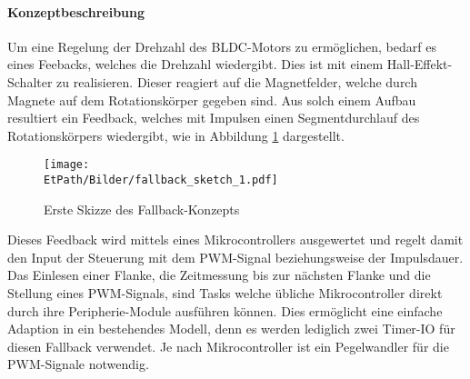 \paragraph{Konzeptbeschreibung\\}
\fi
Um eine Regelung der Drehzahl des BLDC-Motors zu ermöglichen, bedarf es eines
Feebacks, welches die Drehzahl wiedergibt. Dies ist mit einem
Hall-Effekt-Schalter zu realisieren. Dieser reagiert auf die Magnetfelder,
welche durch Magnete auf dem Rotationskörper gegeben sind. Aus solch einem
Aufbau resultiert ein Feedback, welches mit Impulsen einen Segmentdurchlauf
des Rotationskörpers wiedergibt, wie in Abbildung \ref{fig:fallback-sketch}
dargestellt.
\begin{figure}[h!]
	\centering
	\texttt{[image: \\EtPath/Bilder/fallback\_sketch\_1.pdf]}
	\caption{Erste Skizze des Fallback-Konzepts}
	\label{fig:fallback-sketch}
\end{figure}
Dieses Feedback wird mittels eines Mikrocontrollers ausgewertet und regelt
damit den Input der Steuerung mit dem PWM-Signal beziehungsweise der Impulsdauer.
Das Einlesen einer Flanke, die Zeitmessung bis zur nächsten Flanke und die
Stellung eines PWM-Signals, sind Tasks welche übliche Mikrocontroller direkt
durch ihre Peripherie-Module ausführen können. Dies ermöglicht eine einfache
Adaption in ein bestehendes Modell, denn es werden lediglich zwei Timer-IO
für diesen Fallback verwendet. Je nach Mikrocontroller ist ein Pegelwandler
für die PWM-Signale notwendig.
